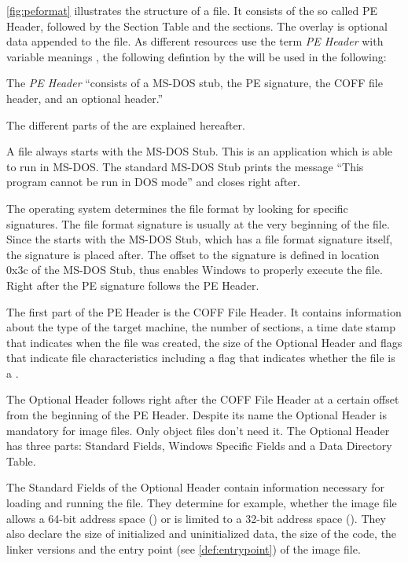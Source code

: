 \autoref{fig:peformat} illustrates the structure of a \PE{} file. It consists of the so called PE Header, followed by the Section Table and the sections. The overlay is optional data appended to the file. As different resources use the term \emph{PE Header} with variable meanings , the following defintion by the \PECOFF{} will be used in the following: 

\begin{definition}[PE Header]
The \emph{PE Header} \enquote{consists of a MS-DOS stub, the PE signature, the COFF file header, and an optional header.} \cite[]{pespec}
\end{definition} 

The different parts of the \PE{} are explained hereafter.

A \PE{} file always starts with the MS-DOS Stub. This is an application which is able to run in MS-DOS. The standard MS-DOS Stub prints the message \enquote{This program cannot be run in DOS mode} and closes right after. 

The operating system determines the file format by looking for specific signatures. The file format signature is usually at the very beginning of the file. Since the \PE{} starts with the MS-DOS Stub, which has a file format signature itself, the \PE{} signature is placed after.  The offset to the \PE{} signature is defined in location 0x3c of the MS-DOS Stub, thus enables Windows to properly execute the \PE{} file. Right after the PE signature follows the PE Header.

The first part of the PE Header is the COFF File Header. It contains information about the type of the target machine, the number of sections, a time date stamp that indicates when the file was created, the size of the Optional Header and flags that indicate file characteristics including a flag that indicates whether the file is a \DLL{}\label{dllflag}.

The Optional Header follows right after the COFF File Header at a certain offset from the beginning of the PE Header. Despite its name the Optional Header is mandatory for image files. Only object files don't need it. The Optional Header has three parts: Standard Fields, Windows Specific Fields and a Data Directory Table.

The Standard Fields of the Optional Header contain information necessary for loading and running the file. They determine for example, whether the image file allows a 64-bit address space (\PEplus{}) or is limited to a 32-bit address space (\PEsmall{}). They also declare \ia{} the size of initialized and uninitialized data, the size of the code, the linker versions and the entry point (see \autoref{def:entrypoint}) of the image file.

